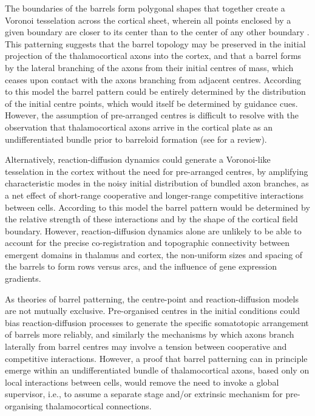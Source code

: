 \documentclass[a4paper,11pt]{article}
\begin{document}
The boundaries of the barrels form polygonal shapes that together create a Voronoi tesselation across the cortical sheet, wherein all points enclosed by a given boundary are closer to its center than to the center of any other boundary \citep{Senft1991}. This patterning suggests that the barrel topology may be preserved in the initial projection of the thalamocortical axons into the cortex, and that a barrel forms by the lateral branching of the axons from their initial centres of mass, which ceases upon contact with the axons branching from adjacent centres. According to this model the barrel pattern could be entirely determined by the distribution of the initial centre points, which would itself be determined by guidance cues. However, the assumption of pre-arranged centres is difficult to resolve with the observation that thalamocortical axons arrive in the cortical plate as an undifferentiated bundle prior to barreloid formation (see \citealp{Erzurumlu2012} for a review).

Alternatively, reaction-diffusion dynamics could generate a Voronoi-like tesselation in the cortex without the need for pre-arranged centres, by amplifying characteristic modes in the noisy initial distribution of bundled axon branches, as a net effect of short-range cooperative and longer-range competitive interactions between cells. According to this model the barrel pattern would be determined by the relative strength of these interactions and by the shape of the cortical field boundary. However, reaction-diffusion dynamics alone are unlikely to be able to account for the precise co-registration and topographic connectivity between emergent domains in thalamus and cortex, the non-uniform sizes and spacing of the barrels to form rows versus arcs, and the influence of gene expression gradients. 

As theories of barrel patterning, the centre-point and reaction-diffusion models are not mutually exclusive. Pre-organised centres in the initial conditions could bias reaction-diffusion processes to generate the specific somatotopic arrangement of barrels more reliably, and similarly the mechanisms by which axons branch laterally from barrel centres may involve a tension between cooperative and competitive interactions. However, a proof that barrel patterning can in principle emerge within an undifferentiated bundle of thalamocortical axons, based only on local interactions between cells, would remove the need to invoke a global supervisor, i.e., to assume a separate stage and/or extrinsic mechanism for pre-organising thalamocortical connections.
\end{document}
